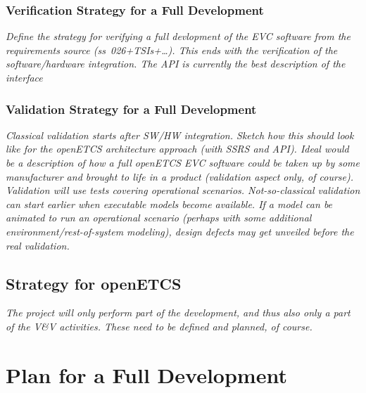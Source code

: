 \documentclass{template/openetcs_report}
\begin{document}
\subsection{Verification Strategy for a Full Development}
\label{sec:verif-strategy-full}



{\it 
Define the strategy for verifying a full devlopment of the EVC software
from the requirements source (ss~026+TSIs+\ldots). This ends with the
verification of the software/hardware integration. The API is
currently the best description of the
interface }

\subsection{Validation Strategy for a Full Development}
\label{sec:valid-strategy-full}

\textit{Classical validation starts after SW/HW integration. Sketch
  how this should look like for the openETCS architecture approach
  (with SSRS and API). Ideal would be a description of how a full
  openETCS EVC software could be taken up by some manufacturer and
  brought to life in a product (validation aspect only, of
  course). Validation will use tests covering operational scenarios.
Not-so-classical validation can start earlier when executable models
become available. If a model can be animated to run an operational
scenario (perhaps with some additional environment/rest-of-system
modeling), design defects may get unveiled before the real validation.}



\section{\VV Strategy for openETCS}
\label{sec:vv-strategy-project}

{\it The project will only perform part of the development, and thus
  also only a part of the V\&V activities. These need to be defined
  and planned, of course.  }

\chapter{\VV Plan for a Full Development}
\end{document}
